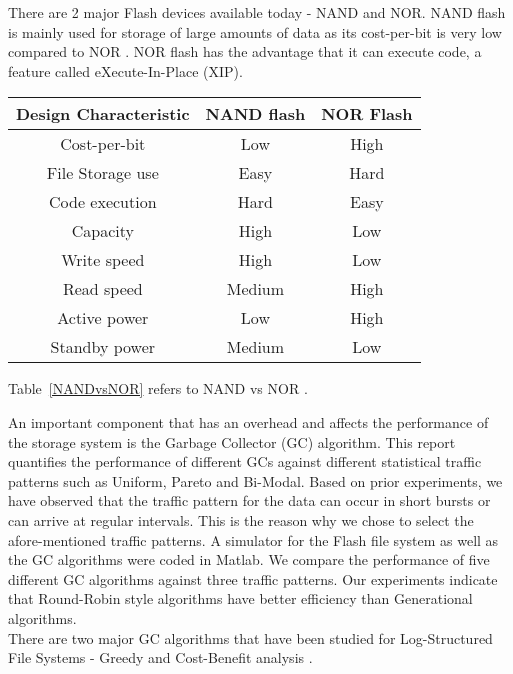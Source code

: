 There are 2 major Flash devices available today - NAND and NOR. NAND flash is mainly used for storage of large amounts of data as its cost-per-bit is very low compared to NOR \cite{Toshiba}. NOR flash has the advantage that it can execute code, a feature called eXecute-In-Place (XIP).

\begin{center}
 \label{NANDvsNOR}
   \begin{tabular} {|  c | c | c | }
       \hline
	{\bf Design Characteristic} & {\bf NAND flash} & {\bf NOR Flash} \\ \hline
	Cost-per-bit & Low & High \\ \hline
	File Storage use & Easy & Hard \\ \hline
	Code execution & Hard & Easy\\ \hline
	Capacity & High & Low\\ \hline
	Write speed & High & Low\\ \hline
	Read speed & Medium & High\\ \hline
	Active power & Low & High\\ \hline
	Standby power & Medium & Low\\
       \hline
   \end{tabular}
\end{center}

Table~\ref{NANDvsNOR} refers to NAND vs NOR \cite{Toshiba}.

An important component that has an overhead and affects the performance of the storage system is the Garbage Collector (GC) algorithm. This report quantifies the performance of different GCs against different statistical traffic patterns such as Uniform, Pareto and Bi-Modal. Based on prior experiments, we have observed that the traffic pattern for the data can occur in short bursts or can arrive at regular intervals. This is the reason why we chose to select the afore-mentioned traffic patterns. A simulator for the Flash file system as well as the GC algorithms were coded in Matlab. We compare the performance of five different GC algorithms against three traffic patterns. Our experiments indicate that Round-Robin style algorithms have better efficiency than Generational algorithms.\\

There are two major GC algorithms that have been studied for Log-Structured File Systems - Greedy and Cost-Benefit analysis \cite{Menon98}. 

